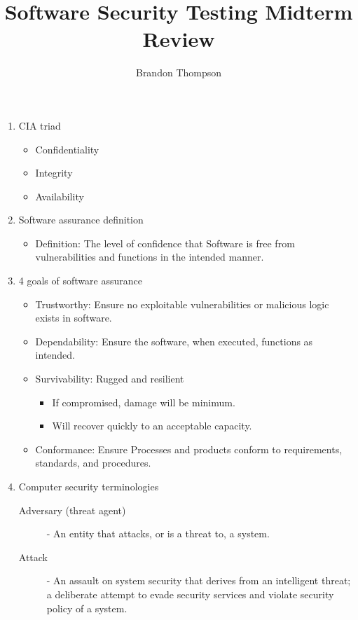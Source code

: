 \documentclass[a4paper]{article}
\begin{document}
\title{Software Security Testing Midterm Review}
\author{Brandon Thompson}
\maketitle

	\begin{enumerate}
		\item CIA triad
			\begin{itemize}
				\item Confidentiality
				\item Integrity
				\item Availability
			\end{itemize}
		\item Software assurance definition
			\begin{itemize}
				\item Definition: The level of confidence that Software is free
					from vulnerabilities and functions in the intended manner.
			\end{itemize}
		\item 4 goals of software assurance 
			\begin{itemize}
				\item Trustworthy: Ensure no exploitable vulnerabilities or
					malicious logic exists in software.
				\item Dependability: Ensure the software, when executed,
					functions as intended.
				\item Survivability: Rugged and resilient
					\begin{itemize}
						\item If compromised, damage will be
							minimum.
						\item Will recover quickly to an acceptable capacity.
					\end{itemize}
				\item Conformance: Ensure Processes and products conform to requirements,
					standards, and procedures.
			\end{itemize}
		\item Computer security terminologies
			\begin{description}
				\item[Adversary (threat agent)] - An entity that attacks, or is a threat
					to, a system.
				\item[Attack] - An assault on system security that derives from an
					intelligent threat; a deliberate attempt to evade security
					services and violate security policy of a system.

\end{description}
\end{enumerate}
\end{document}
